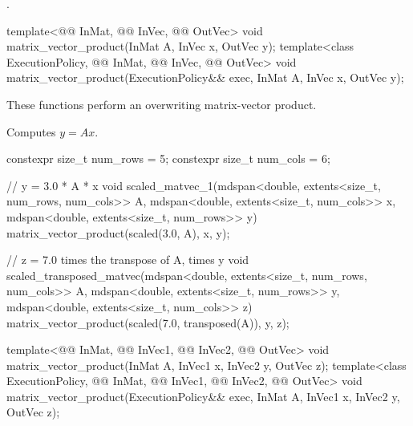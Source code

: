 \pnum
\complexity
{}.

%
\begin{itemdecl}
template<@@ InMat, @@ InVec, @@ OutVec>
  void matrix_vector_product(InMat A, InVec x, OutVec y);
template<class ExecutionPolicy, @@ InMat, @@ InVec, @@ OutVec>
  void matrix_vector_product(ExecutionPolicy&& exec, InMat A, InVec x, OutVec y);
\end{itemdecl}

\begin{itemdescr}
\pnum
These functions perform an overwriting matrix-vector product.

\pnum
\effects
Computes $y = A x$.
\end{itemdescr}

\begin{example}
\begin{codeblock}
constexpr size_t num_rows = 5;
constexpr size_t num_cols = 6;

// y = 3.0 * A * x
void scaled_matvec_1(mdspan<double, extents<size_t, num_rows, num_cols>> A,
  mdspan<double, extents<size_t, num_cols>> x, mdspan<double, extents<size_t, num_rows>> y) {
  matrix_vector_product(scaled(3.0, A), x, y);
}

// z = 7.0 times the transpose of A, times y
void scaled_transposed_matvec(mdspan<double, extents<size_t, num_rows, num_cols>> A,
  mdspan<double, extents<size_t, num_rows>> y, mdspan<double, extents<size_t, num_cols>> z) {
  matrix_vector_product(scaled(7.0, transposed(A)), y, z);
}
\end{codeblock}
\end{example}

%
\begin{itemdecl}
  template<@@ InMat, @@ InVec1, @@ InVec2, @@ OutVec>
    void matrix_vector_product(InMat A, InVec1 x, InVec2 y, OutVec z);
  template<class ExecutionPolicy,
           @@ InMat, @@ InVec1, @@ InVec2, @@ OutVec>
    void matrix_vector_product(ExecutionPolicy&& exec,
                               InMat A, InVec1 x, InVec2 y, OutVec z);
\end{itemdecl}

